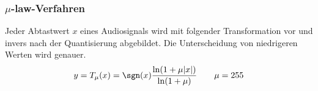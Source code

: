 \begin{sectionbox}
    \subsubsection{$\mu$-law-Verfahren}
    Jeder Abtastwert $x$ eines Audiosignals wird mit folgender Transformation vor und invers nach der Quantisierung abgebildet. 
    Die Unterscheidung von niedrigeren Werten wird genauer.
    \begin{equation*}
        y=T_\mu(x) = \sgn(x)\frac{\ln(1+\mu|x|)}{\ln(1+\mu)} \qquad \mu=255
    \end{equation*}
\end{sectionbox}
